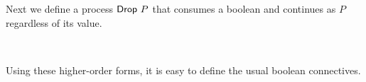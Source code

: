 Next we define a process $\AgdaFunction{Drop}~P$ that consumes a boolean and
continues as $P$ regardless of its value.

\begin{code}%
\>[0]\AgdaSpace{}%
\AgdaSymbol{:}\AgdaSpace{}%
\AgdaFunction{∀[}\AgdaSpace{}%
\AgdaSpace{}%
\AgdaSpace{}%
\AgdaSymbol{(}\AgdaSpace{}%
\AgdaSpace{}%
\AgdaSymbol{)}\AgdaSpace{}%
\AgdaSpace{}%
\AgdaSpace{}%
\AgdaFunction{]}\<%
\\
\>[0]\AgdaSpace{}%
\AgdaSpace{}%
\AgdaSymbol{=}\AgdaSpace{}%
\AgdaSpace{}%
\AgdaSpace{}%
\AgdaSpace{}%
\<%
\end{code}

Using these higher-order forms, it is easy to define the usual boolean
connectives.

